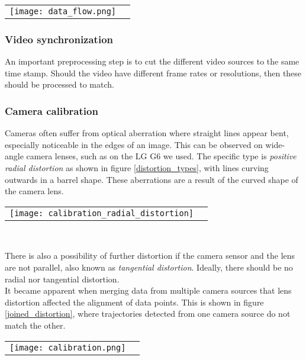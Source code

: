 \color{red}
\raggedbottom
\begin{tabular}{@{}cc}
\texttt{[image: data\_flow.png]} 
\end{tabular}
\label{data}
\raggedbottom
\color{black}

\subsubsection{Video synchronization}
An important preprocessing step is to cut the different video sources to the same time stamp.
Should the video have different frame rates or resolutions, then these should be processed to match.

\subsubsection{Camera calibration}
Cameras often suffer from optical aberration where straight lines appear bent, especially noticeable in the edges of an image. 
This can be observed on wide-angle camera lenses, such as on the LG G6 we used.
The specific type is \textit{positive radial distortion} as shown in figure \ref{distortion_types}, with lines curving outwards in a barrel shape.
These aberrations are a result of the curved shape of the camera lens.
\ \\ 

\raggedbottom
\begin{tabular}{@{}cc}
\texttt{[image: calibration\_radial\_distortion]} 
\end{tabular}
\label{distortion_types}
\

There is also a possibility of further distortion if the camera sensor and the lens are not parallel, also known as \textit{tangential distortion}.
Ideally, there should be no radial nor tangential distortion.
\ \\
It became apparent when merging data from multiple camera sources that lens distortion affected the alignment of data points.
This is shown in figure \ref{joined_distortion}, where trajectories detected from one camera source do not match the other.

\raggedbottom
\begin{tabular}{@{}cc}
\texttt{[image: calibration.png]}
\end{tabular}
\label{joined_distortion}
\

